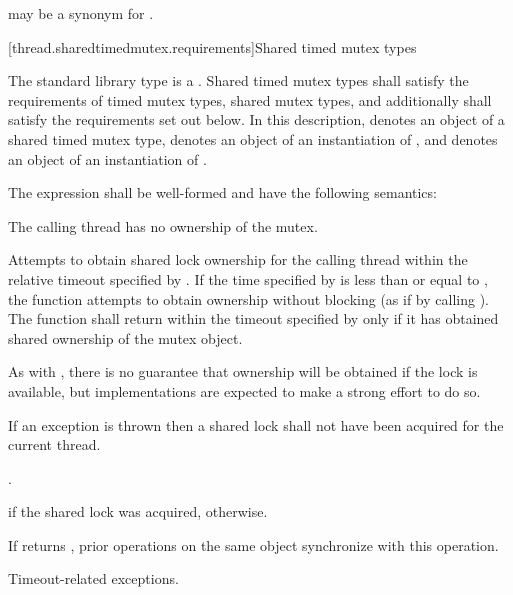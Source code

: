 \pnum
{} may be a synonym for .

[thread.sharedtimedmutex.requirements]{Shared timed mutex types}

\pnum
The standard library type  is a
. Shared timed mutex types shall satisfy the requirements of
timed mutex types,
shared mutex types, and additionally
shall satisfy the requirements set out below. In this description,
 denotes an object of a shared timed mutex type,
 denotes an object of an instantiation of
, and
 denotes an object of an instantiation of
.

\pnum
The expression  shall be well-formed and
have the following semantics:

\begin{itemdescr}
\pnum
\requires The calling thread has no ownership of the mutex.

\pnum
\effects Attempts to obtain
shared lock ownership for the calling thread within the relative
timeout specified by . If the time
specified by  is less than or equal to ,
the function attempts to obtain ownership without blocking (as if by calling
). The function shall return within the timeout
specified by  only if it has obtained shared ownership of the
mutex object. \begin{note} As with , there is no guarantee that
ownership will be obtained if the lock is available, but implementations are
expected to make a strong effort to do so. \end{note}
If an exception is thrown then a shared lock shall not have been acquired for
the current thread.

\pnum
\returntype {}.

\pnum
\returns {} if the shared lock was acquired,  otherwise.

\pnum
\sync If  returns , prior
 operations on the same object synchronize
with this operation.

\pnum
\throws Timeout-related exceptions.
\end{itemdescr}

